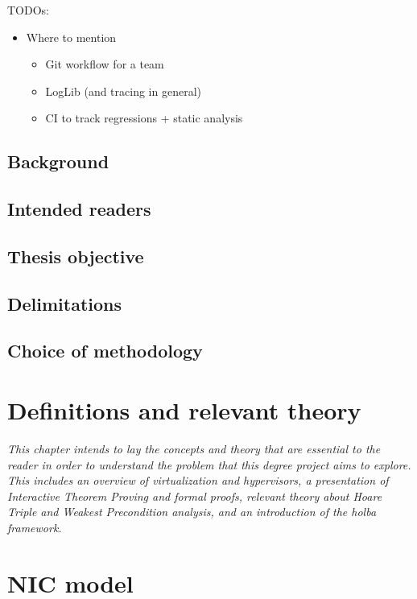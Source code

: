 \documentclass{kththesis}
\begin{document}
TODOs:
\begin{itemize}
  \item Where to mention
  \begin{itemize}
  \item Git workflow for a team
  \item LogLib (and tracing in general)
  \item CI to track regressions + static analysis
  \end{itemize}
\end{itemize}

\section{Background}

\section{Intended readers}

\section{Thesis objective}

\section{Delimitations}

\section{Choice of methodology}

\chapter{Definitions and relevant theory}
\textit{This chapter intends to lay the concepts and theory that are essential to the reader in order to understand the problem that this degree project aims to explore.  This includes an overview of virtualization and hypervisors, a presentation of Interactive Theorem Proving and formal proofs, relevant theory about Hoare Triple and Weakest Precondition analysis, and an introduction of the \gls{holba} framework.}


\chapter{NIC model}
%
%
\end{document}
